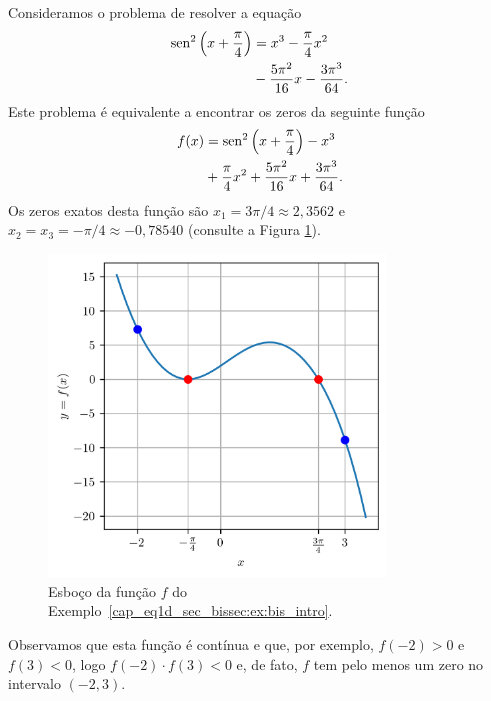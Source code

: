 \begin{ex}\label{cap_eq1d_sec_bissec:ex:bis_intro}
  Consideramos o problema de resolver a equação
  \begin{equation}
    \begin{aligned}
      \operatorname{sen}^2\left(x+\frac{\pi}{4}\right) &= x^3 - \frac{\pi}{4}x^2\\
      &- \frac{5\pi^2}{16}x - \frac{3\pi^3}{64}.
    \end{aligned}
\end{equation}
Este problema é equivalente a encontrar os zeros da seguinte função
\begin{equation}
  \begin{aligned}
    f(x) &= \operatorname{sen}^2\left(x+\frac{\pi}{4}\right) - x^3 \\
         &+ \frac{\pi}{4}x^2 + \frac{5\pi^2}{16}x + \frac{3\pi^3}{64}.
  \end{aligned}
\end{equation}
Os zeros exatos desta função são $x_1=3\pi/4\approx 2,3562$ e $x_2=x_3=-\pi/4\approx -0,78540$ (consulte a Figura \ref{cap_eq1d_sec_bissec:fig:bis_intro}).

\begin{figure}[H]
  \centering
  \includegraphics[width=0.8\textwidth]{./cap_eq1d/dados/fig_bis_intro/fig}
  \caption{Esboço da função $f$ do Exemplo~\ref{cap_eq1d_sec_bissec:ex:bis_intro}.}
  \label{cap_eq1d_sec_bissec:fig:bis_intro}
\end{figure}

Observamos que esta função é contínua e que, por exemplo, $f(-2)>0$ e $f(3)<0$, logo $f(-2)\cdot f(3) < 0$ e, de fato, $f$ tem pelo menos um zero no intervalo $(-2, 3)$.
\end{ex}

